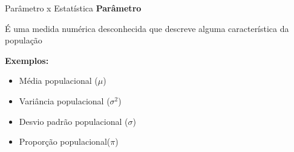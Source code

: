 





\begin{frame}{Parâmetro x Estatística}
\textbf{Parâmetro}
\begin{definicao}
    É uma medida numérica desconhecida que descreve alguma característica da população
\end{definicao}


\textbf{Exemplos:}
\begin{itemize}
    \item Média populacional ($\mu$)
    \item Variância populacional ($\sigma^2$)
    \item Desvio padrão populacional ($\sigma$)
    \item Proporção populacional($\pi$)
\end{itemize}
\end{frame}


